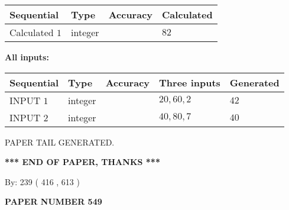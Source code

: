 \documentclass[12pt]{article}
\begin{document}
   
   
   
\noindent{}
   
   
  
  
\noindent\begin{tabular}{|l|l|l|l|}
\hline
 Sequential & Type & Accuracy & Calculated \\ 
\hline
 
 
  Calculated $  1 $ & integer &  & 
  $ 82 $ 
 \\  \hline  
 \end{tabular}
   
   
   
   
\noindent\vspace{0.1in}\hspace{-0.08in} {\textbf{\Large{All inputs: }}}
   
   
  
  
\noindent\begin{tabular}{|l|l|l|l|l|}
\hline
 Sequential & Type & Accuracy & Three inputs & Generated \\ 
\hline
 
 
  INPUT $  1 $ & integer &  & $
 20
 , 
 60
 , 
 2
 $ & $ 42 $ 
 \\  \hline  
 
 
  INPUT $  2 $ & integer &  & $
 40
 , 
 80
 , 
 7
 $ & $ 40 $ 
 \\  \hline  
 \end{tabular}
   
   
   
   
   
   
 \vspace{0.2in}
 
   
   
\vspace{2.0in} PAPER TAIL GENERATED.
   
   
   
   
\vspace{1.0in} 
{\textbf{\large{ *** END OF PAPER, THANKS *** }}} 
   
   
\hspace{1.0in} By: 
 239 ( 416 ,  613 )
   
   
   
   
\newpage 
\setcounter{page}{ 
   549001 } 
   
   
   
   
 {\textbf{ \Large{ PAPER NUMBER  549  }}}
   
\end{document}
